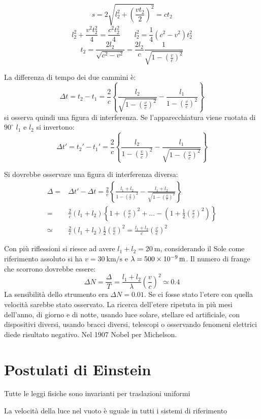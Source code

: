 \parbox[]{\textwidth}{
   \[s=2\sqrt{l_2^2+\left(\frac{vt_2}{2}\right)^2}=ct_2\]
   \[l_2^2+\frac{v^2t_2^2}{4}=\frac{c^2t_2^2}{4}\qquad l_2^2=\frac{1}{4}\left(c^2-v^2\right)t_2^2\]
   \[t_2=\frac{2l_2}{\sqrt{c^2-v^2}}=\frac{2l_2}{c}\frac{1}{\sqrt{1-\left(\frac{v}{c}\right)^2}}\]
}
La differenza di tempo dei due cammini è:
\[\Delta t=t_2-t_1=\frac{2}{c}\left\{\frac{l_2}{\sqrt{1-\left(\frac{v}{c}\right)^2}}-\frac{l_1}{1-\left(\frac{v}{c}\right)^2}\right\}\]
si osserva quindi una figura di interferenza. Se l'apparecchiatura viene ruotata di $90^\circ$ $l_1$ e $l_2$ si invertono:
\[\Delta t'={t_2}'-{t_1}'=\frac{2}{c}\left\{\frac{l_2}{{1-\left(\frac{v}{c}\right)^2}}-\frac{l_1}{\sqrt{1-\left(\frac{v}{c}\right)^2}}\right\}\]

\parbox[]{\textwidth}{
   Si dovrebbe osservare una figura di interferenza diversa:
   \begin{align*}
      \Delta= & \Delta t'-\Delta t=\frac{2}{c}\left\{\frac{l_1+l_2}{{1-\left(\frac{v}{c}\right)^2}}-\frac{l_1+l_2}{\sqrt{1-\left(\frac{v}{c}\right)^2}}\right\} \\
      =       & \frac{2}{c}(l_1+l_2)\left\{1+\left(\frac{v}{c}\right)^2+\ldots-\left(1+\frac{1}{2}\left(\frac{v}{c}\right)^2\right)\right\}                     \\
      \simeq  & \frac{2}{c}(l_1+l_2)\frac{1}{2}\left(\frac{v}{c}\right)^2=\frac{l_1+l_2}{c}\left(\frac{v}{c}\right)^2\end{align*}
}
Con più riflessioni si riesce ad avere $l_1+l_2=\SI{20}{\metre}$, considerando il Sole come riferimento assoluto si ha $v=\SI{30}{\kilo\meter\per\second}$ e $\lambda=\SI{500E-9}{\metre}$.
Il numero di frange che scorrono dovrebbe essere:
\[\Delta N=\frac{\Delta}{T}=\frac{l_1+l_2}{\lambda}\left(\frac{v}{c}\right)^2\simeq 0.4\]
La sensibilità dello strumento era $\Delta N=0.01$. Se ci fosse stato l'etere con quella velocità sarebbe stato osservato. La ricerca dell'etere ripetuta in più mesi dell'anno, di giorno e di notte, usando luce solare, stellare ed artificiale, con dispositivi diversi, usando bracci diversi, telescopi o osservando fenomeni elettrici diede risultato negativo. Nel 1907 Nobel per Michelson.
\section{Postulati di Einstein}
\begin{post}
   Tutte le leggi fisiche sono invarianti per traslazioni uniformi
\end{post}
\begin{post}
   La velocità della luce nel vuoto è uguale in tutti i sistemi di riferimento
\end{post}

